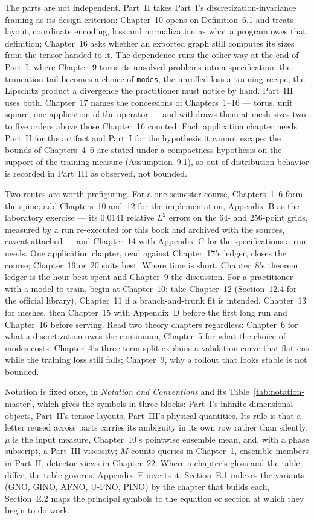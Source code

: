 The parts are not independent. Part~II takes Part~I's discretization-invariance framing as its
design criterion: Chapter~10 opens on Definition~6.1 and treats layout, coordinate encoding, loss
and normalization as what a program owes that definition; Chapter~16 asks whether an exported
graph still computes its sizes from the tensor handed to it. The dependence runs the
other way at the end of Part~I, where Chapter~9 turns its unsolved problems into a
specification: the truncation tail becomes a choice of \texttt{modes}, the unrolled loss a
training recipe, the Lipschitz product a divergence the practitioner must notice by hand.
Part~III uses both. Chapter~17 names the concessions of Chapters~1--16 --- torus, unit square,
one application of the operator --- and withdraws them at mesh sizes two to five orders above
those Chapter~16 counted. Each application chapter needs Part~II for the artifact and Part~I for
the hypothesis it cannot escape: the bounds of Chapters~4--6 are stated under a compactness
hypothesis on the support of the training measure (Assumption~9.1), so out-of-distribution
behavior is recorded in Part~III as observed, not bounded.

Two routes are worth prefiguring. For a one-semester course, Chapters~1--6 form the spine; add
Chapters~10 and~12 for the implementation, Appendix~B as the laboratory exercise --- its $0.0141$
relative $L^{2}$ errors on the $64$- and $256$-point grids, measured by a run re-executed
for this book and archived with the sources, caveat attached --- and Chapter~14
with Appendix~C for the specifications a run needs. One application chapter, read against
Chapter~17's ledger, closes the course; Chapter~19 or~20 suits best. Where time is short,
Chapter~8's theorem ledger is the hour best spent and Chapter~9 the discussion. For a
practitioner with a model to train, begin at Chapter~10; take Chapter~12 (Section~12.4 for the
official library), Chapter~11 if a branch-and-trunk fit is intended, Chapter~13 for meshes, then
Chapter~15 with Appendix~D before the first long run and Chapter~16 before serving. Read two
theory chapters regardless: Chapter~6 for what a discretization owes the continuum, Chapter~5
for what the choice of modes costs. Chapter~4's three-term split explains a validation curve
that flattens while the training loss still falls; Chapter~9, why a rollout that looks stable is
not bounded.

Notation is fixed once, in \emph{Notation and Conventions} and its Table~\ref{tab:notation-master},
which gives the symbols in three blocks: Part~I's infinite-dimensional objects, Part~II's tensor
layouts, Part~III's physical quantities. Its rule is that a letter reused across parts carries
its ambiguity in its own row rather than silently: $\mu$ is the input measure, Chapter~10's
pointwise ensemble mean, and, with a phase subscript, a Part~III viscosity; $M$ counts queries in
Chapter~1, ensemble members in Part~II, detector views in Chapter~22. Where a chapter's gloss and
the table differ, the table governs. Appendix~E inverts it: Section~E.1 indexes the variants (GNO,
GINO, AFNO, U-FNO, PINO) by the chapter that builds each, Section~E.2 maps the
principal symbols to the equation or section at which they begin to do work.

